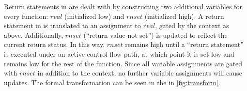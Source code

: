 Return statements in \constc are dealt with by constructing two additional
variables for every function: $rval$ (initialized low) and $rnset$ (initialized
high). A return statement in \constc is translated to an assignment to $rval$,
gated by the context as above. Additionally, $rnset$ (``return value not
set'') is updated to reflect the current return status.
In this way, $rnset$ remains high until a ``return statement'' is executed
under an active control flow path, at which point it is set low and remains low
for the rest of the function. Since all variable assignments are gated with
$rnset$ in addition to the context, no further variable assignments will cause
updates. The formal transformation can be seen in the  in \autoref{fig:transform}.
